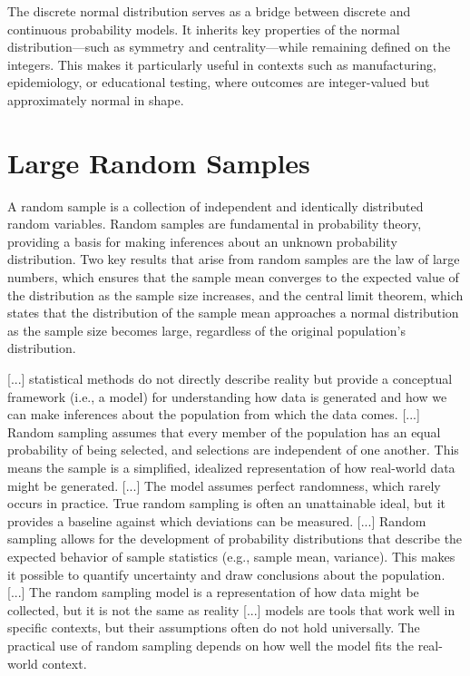 The discrete normal distribution serves as a bridge between discrete and continuous probability models. It inherits key properties of the normal distribution—such as symmetry and centrality—while remaining defined on the integers. This makes it particularly useful in contexts such as manufacturing, epidemiology, or educational testing, where outcomes are integer-valued but approximately normal in shape.

%
%

\section{Large Random Samples}
\label{sec:probability_random_samples}

A random sample is a collection of independent and identically distributed random variables. Random samples are fundamental in probability theory, providing a basis for making inferences about an unknown probability distribution. Two key results that arise from random samples are the law of large numbers, which ensures that the sample mean converges to the expected value of the distribution as the sample size increases, and the central limit theorem, which states that the distribution of the sample mean approaches a normal distribution as the sample size becomes large, regardless of the original population's distribution.

{\color{red} [...] statistical methods do not directly describe reality but provide a conceptual framework (i.e., a model) for understanding how data is generated and how we can make inferences about the population from which the data comes. [...] Random sampling assumes that every member of the population has an equal probability of being selected, and selections are independent of one another. This means the sample is a simplified, idealized representation of how real-world data might be generated. [...] The model assumes perfect randomness, which rarely occurs in practice. True random sampling is often an unattainable ideal, but it provides a baseline against which deviations can be measured. [...] Random sampling allows for the development of probability distributions that describe the expected behavior of sample statistics (e.g., sample mean, variance). This makes it possible to quantify uncertainty and draw conclusions about the population. [...] The random sampling model is a representation of how data might be collected, but it is not the same as reality [...] models are tools that work well in specific contexts, but their assumptions often do not hold universally. The practical use of random sampling depends on how well the model fits the real-world context. }

